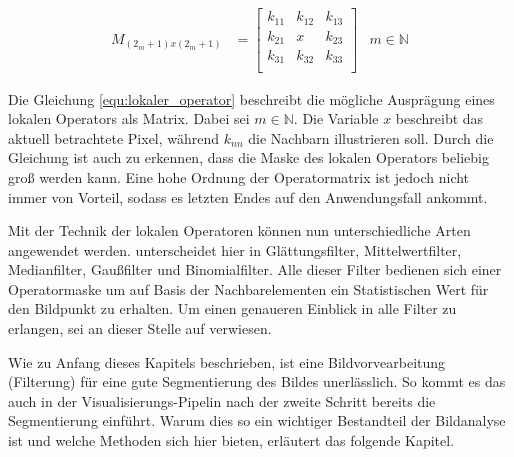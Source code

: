 \begin{align}
	\label{equ:lokaler_operator}M_{(2_m+1)x(2_m+1)} & = \begin{bmatrix}k_{11}&k_{12}&k_{13}\\ k_{21}&x&k_{23}\\ k_{31}&k_{32}&k_{33}\\\end{bmatrix} & m \in \mathbb{N}
\end{align}

Die Gleichung \ref{equ:lokaler_operator} beschreibt die mögliche Ausprägung
eines lokalen Operators als Matrix. Dabei sei $m \in \mathbb{N}$. Die Variable
$x$ beschreibt das aktuell betrachtete Pixel, während $k_{nn}$ die Nachbarn illustrieren
soll. Durch die Gleichung ist auch zu erkennen, dass die Maske des lokalen Operators
beliebig groß werden kann. Eine hohe Ordnung der Operatormatrix ist jedoch nicht
immer von Vorteil, sodass es letzten Endes auf den Anwendungsfall ankommt.

Mit der Technik der lokalen Operatoren können nun unterschiedliche Arten angewendet
werden. \citet[S.~54 - 55]{handels2000} unterscheidet hier in Glättungsfilter,
Mittelwertfilter, Medianfilter, Gaußfilter und Binomialfilter. Alle dieser Filter
bedienen sich einer Operatormaske um auf Basis der Nachbarelementen ein Statistischen
Wert für den Bildpunkt zu erhalten. Um einen genaueren Einblick in alle Filter
zu erlangen, sei an dieser Stelle auf \citet[S.~54 - 55]{handels2000} verwiesen.

Wie zu Anfang dieses Kapitels beschrieben, ist eine Bildvorvearbeitung (Filterung)
für eine gute Segmentierung des Bildes unerlässlich. So kommt es das auch in der
Visualisierungs-Pipelin nach \citet[S.~50]{handels2000} der zweite Schritt bereits
die Segmentierung einführt. Warum dies so ein wichtiger Bestandteil der
Bildanalyse ist und welche Methoden sich hier bieten, erläutert das folgende Kapitel.

\pagebreak

